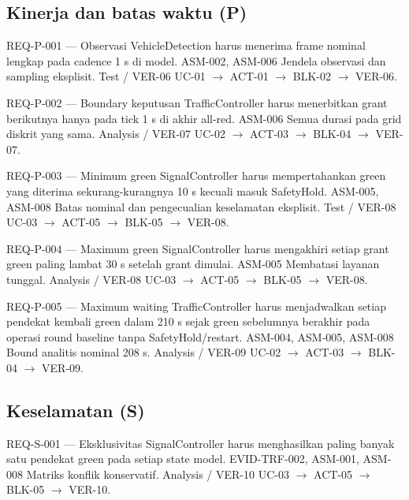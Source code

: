 \subsection{Kinerja dan batas waktu (P)}

\requirementcard
{REQ-P-001 --- Observasi}
{VehicleDetection harus menerima frame nominal lengkap pada cadence 1 s di model.}
{ASM-002, ASM-006}
{Jendela observasi dan sampling eksplisit.}
{Test / VER-06}
{UC-01 $\rightarrow$ ACT-01 $\rightarrow$ BLK-02 $\rightarrow$ VER-06.}

\requirementcard
{REQ-P-002 --- Boundary keputusan}
{TrafficController harus menerbitkan grant berikutnya hanya pada tick 1 s di akhir all-red.}
{ASM-006}
{Semua durasi pada grid diskrit yang sama.}
{Analysis / VER-07}
{UC-02 $\rightarrow$ ACT-03 $\rightarrow$ BLK-04 $\rightarrow$ VER-07.}

\requirementcard
{REQ-P-003 --- Minimum green}
{SignalController harus mempertahankan green yang diterima sekurang-kurangnya 10 s kecuali masuk SafetyHold.}
{ASM-005, ASM-008}
{Batas nominal dan pengecualian keselamatan eksplisit.}
{Test / VER-08}
{UC-03 $\rightarrow$ ACT-05 $\rightarrow$ BLK-05 $\rightarrow$ VER-08.}

\requirementcard
{REQ-P-004 --- Maximum green}
{SignalController harus mengakhiri setiap grant green paling lambat 30 s setelah grant dimulai.}
{ASM-005}
{Membatasi layanan tunggal.}
{Analysis / VER-08}
{UC-03 $\rightarrow$ ACT-05 $\rightarrow$ BLK-05 $\rightarrow$ VER-08.}

\requirementcard
{REQ-P-005 --- Maximum waiting}
{TrafficController harus menjadwalkan setiap pendekat kembali green dalam 210 s sejak green sebelumnya berakhir pada operasi round baseline tanpa SafetyHold/restart.}
{ASM-004, ASM-005, ASM-008}
{Bound analitis nominal 208 s.}
{Analysis / VER-09}
{UC-02 $\rightarrow$ ACT-03 $\rightarrow$ BLK-04 $\rightarrow$ VER-09.}

\subsection{Keselamatan (S)}

\requirementcard
{REQ-S-001 --- Eksklusivitas}
{SignalController harus menghasilkan paling banyak satu pendekat green pada setiap state model.}
{EVID-TRF-002, ASM-001, ASM-008}
{Matriks konflik konservatif.}
{Analysis / VER-10}
{UC-03 $\rightarrow$ ACT-05 $\rightarrow$ BLK-05 $\rightarrow$ VER-10.}

